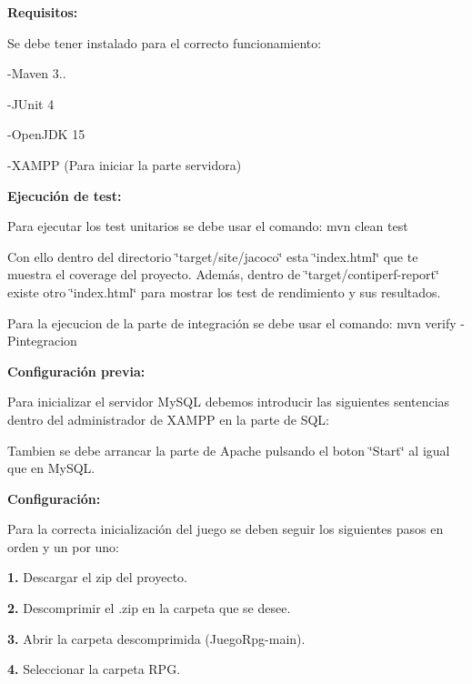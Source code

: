 {\bfseries{Requisitos\+:}}

Se debe tener instalado para el correcto funcionamiento\+:

-\/Maven 3..

-\/JUnit 4

-\/Open\+JDK 15

-\/XAMPP (Para iniciar la parte servidora)

{\bfseries{Ejecución de test\+:}}

Para ejecutar los test unitarios se debe usar el comando\+: {\ttfamily mvn clean test}

Con ello dentro del directorio \char`\"{}target/site/jacoco\char`\"{} esta \char`\"{}index.\+html\char`\"{} que te muestra el coverage del proyecto. Además, dentro de \char`\"{}target/contiperf-\/report\char`\"{} existe otro \char`\"{}index.\+html\char`\"{} para mostrar los test de rendimiento y sus resultados.

Para la ejecucion de la parte de integración se debe usar el comando\+: {\ttfamily mvn verify -\/Pintegracion}

{\bfseries{Configuración previa\+:}}

Para inicializar el servidor My\+SQL debemos introducir las siguientes sentencias dentro del administrador de XAMPP en la parte de SQL\+: 
\begin{DoxyCode}{0}
\DoxyCodeLine{}
\DoxyCodeLine{}

\end{DoxyCode}


Tambien se debe arrancar la parte de Apache pulsando el boton \char`\"{}\+Start\char`\"{} al igual que en My\+SQL.

{\bfseries{Configuración\+:}}

Para la correcta inicialización del juego se deben seguir los siguientes pasos en orden y un por uno\+:

{\bfseries{1.}} Descargar el zip del proyecto.

{\bfseries{2.}} Descomprimir el .zip en la carpeta que se desee.

{\bfseries{3.}} Abrir la carpeta descomprimida (Juego\+Rpg-\/main).

{\bfseries{4.}} Seleccionar la carpeta RPG.

